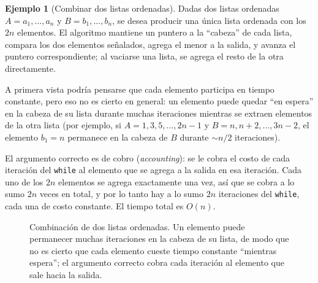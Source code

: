 \documentclass[12pt, spanish, oneside, openany]{book}
\theoremstyle{uprightplain}
\theoremstyle{definition}
\newtheorem{ejemplo}[teorema]{Ejemplo}
\theoremstyle{remark}
\theoremstyle{definition}
\begin{document}
\begin{ejemplo}[Combinar dos listas ordenadas]
\label{ej:merge-lineal}
Dadas dos listas ordenadas $A=a_1,\dots,a_n$ y $B=b_1,\dots,b_n$, se desea producir una única lista ordenada con los $2n$ elementos. El algoritmo mantiene un puntero a la ``cabeza'' de cada lista, compara los dos elementos señalados, agrega el menor a la salida, y avanza el puntero correspondiente; al vaciarse una lista, se agrega el resto de la otra directamente.

A primera vista podría pensarse que cada elemento participa en tiempo constante, pero eso no es cierto en general: un elemento puede quedar ``en espera'' en la cabeza de su lista durante muchas iteraciones mientras se extraen elementos de la otra lista (por ejemplo, si $A=1,3,5,\dots,2n-1$ y $B=n,n+2,\dots,3n-2$, el elemento $b_1=n$ permanece en la cabeza de $B$ durante $\sim n/2$ iteraciones).

El argumento correcto es de cobro (\emph{accounting}): se le cobra el costo de cada iteración del \texttt{while} al elemento que se agrega a la salida en esa iteración. Cada uno de los $2n$ elementos se agrega exactamente una vez, así que se cobra a lo sumo $2n$ veces en total, y por lo tanto hay a lo sumo $2n$ iteraciones del \texttt{while}, cada una de costo constante. El tiempo total es $O(n)$.
\end{ejemplo}
\begin{figure}[H]
\centering
{}
\caption{Combinación de dos listas ordenadas. Un elemento puede permanecer
muchas iteraciones en la cabeza de su lista, de modo que no es cierto que cada
elemento cueste tiempo constante ``mientras espera''; el argumento correcto
cobra cada iteración al elemento que sale hacia la salida.}
\label{fig:merge}
\end{figure}
\end{document}

